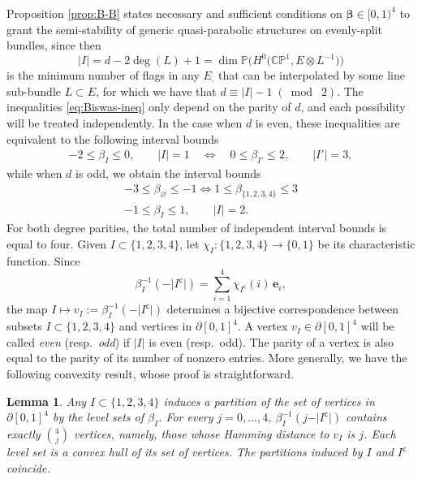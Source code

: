 \documentclass[pdftex]{sigma}
\newcommand{\field}[1]{\ensuremath{\mathbb{#1}}}
\newcommand{\CC}{\field{C}}
\newcommand{\PP}{\field{P}}
\newcommand{\qp}{\boldsymbol{\cdot}}
\numberwithin{equation}{section}
\newtheorem{Lemma}[Theorem]{Lemma}
\begin{document}
Proposition \ref{prop:B-B} states necessary and sufficient conditions on $\pmb{\beta}\in[0,1)^{4}$ to grant the semi-stability of generic quasi-parabolic structures on evenly-split bundles, since then
\[
\vert I\vert = d-2\deg(L)+1 = \dim \PP\bigl(H^{0}\big(\CC\PP^{1},E\otimes L^{-1}\big)\bigr)
\]
is the minimum number of flags in any $E_{\qp}$ that can be interpolated by some line sub-bundle $L\subset E$, for which we have that $d \equiv \vert I\vert -1\; (\bmod\; 2)$.
The inequalities \eqref{eq:Biswas-ineq} only depend on the parity of $d$, and each possibility will be treated independently. In the case when $d$ is even, these inequalities are equivalent to the following
interval bounds
\begin{gather}\label{eq:bound1}
-2\leq\beta_{I} \leq 0, \qquad \vert I\vert=1\quad \Leftrightarrow\quad 0\leq\beta_{I'} \leq 2, \qquad \vert I'\vert=3,
\end{gather}
while when $d$ is odd, we obtain the interval bounds
\begin{gather}\label{eq:bound2}
-3 \leq\beta_{\varnothing }\leq -1\Leftrightarrow 1 \leq \beta_{\{1,2,3,4\}} \leq 3
\\ \label{eq:bound3}
-1 \leq \beta_{I} \leq 1,\qquad \vert I\vert=2.
\end{gather}
For both degree parities, the total number of independent interval bounds is equal to four.
Given $I\subset \{1,2,3,4\}$, let $\chi_{I}\colon \{1,2,3,4\}\rightarrow\{0,1\}$ be its characteristic function. Since
\[
\beta_{I}^{-1}(-\vert I^{\mathsf{c}}\vert) = \sum_{i=1}^{4}\chi_{I^{\mathsf{c}}}(i)\,\mathbf{e}_{i},
\]
the map $I\mapsto v_{I}:=\beta^{-1}_{I}(-\vert I^{\mathsf{c}}\vert)$ determines a bijective correspondence between subsets $I\subset \{1,2,3,4\}$ and vertices in $\partial [0,1]^{4}$. A vertex $v_{I}\in
\partial[0,1]^{4}$ will be called \emph{even} (resp.~\emph{odd}) if $\vert I\vert$ is even (resp.~odd). The parity of a vertex is also equal to the parity of its number of nonzero entries. More generally, we have the following convexity result, whose proof is straightforward.

\begin{Lemma}\label{lemma:level-set}
Any $I\subset \{1,2,3,4\}$ induces a partition of the set of vertices in $\partial [0,1]^{4}$ by the level sets of $\beta_{I}$. For every $j=0,\dots,4$, $\beta_{I}^{-1}(j - \vert I^{\mathsf{c}}\vert)$ contains exactly ${4\choose j}$ vertices, namely, those whose Hamming distance to $v_{I}$ is $j$. Each level set is a convex hull of its set of vertices. The partitions induced by $I$ and $I^{\mathsf{c}}$ coincide.
\end{Lemma}
\end{document}
